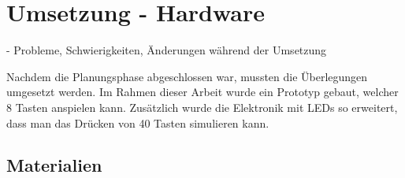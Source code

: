
\chapter{Umsetzung - Hardware} \label{umsetzungHW}

\nocite{*}
- Probleme, Schwierigkeiten, Änderungen während der Umsetzung

Nachdem die Planungsphase abgeschlossen war, mussten die Überlegungen umgesetzt werden.
Im Rahmen dieser Arbeit wurde ein Prototyp gebaut, welcher 8 Tasten anspielen kann.
Zusätzlich wurde die Elektronik mit LEDs so erweitert, dass man das Drücken von 40 Tasten simulieren kann. %

\section{Materialien}
